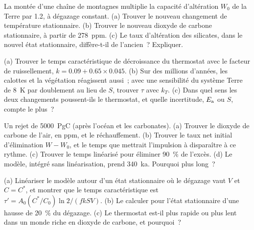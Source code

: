 \begin{exercise}[$\star\star$]\label{exo:b2:deep-time-climate:9}
La montée d'une chaîne de montagnes multiplie la capacité d'altération $W_0$ de la Terre par 1.2, à dégazage
constant. (a) Trouver le nouveau changement de température stationnaire. (b) Trouver le nouveau dioxyde de carbone
stationnaire, à partir de \qty{278}{ppm}. (c) Le taux d'altération des silicates, dans le nouvel état stationnaire,
diffère-t-il de l'ancien~? Expliquer.
\end{exercise}

\begin{exercise}[$\star\star\star$]\label{exo:b2:deep-time-climate:10}
(a) Trouver le temps caractéristique de décroissance du thermostat avec le facteur de ruissellement,
$k = 0.09 + 0.65\times0.045$. (b) Sur des millions d'années, les calottes et la végétation réagissent aussi~; avec une
sensibilité du système Terre de \qty{8}{K} par doublement au lieu de $S$, trouver $\tau$ avec $k_T$. (c) Dans quel sens
les deux changements poussent-ils le thermostat, et quelle incertitude, $E_{\text a}$ ou $S$, compte le plus~?
\end{exercise}

\begin{exercise}[$\star\star\star$]\label{exo:b2:deep-time-climate:11}
Un rejet de \qty{5000}{PgC} (après l'océan et les carbonates). (a) Trouver le dioxyde de carbone de
l'air, en ppm, et le réchauffement. (b) Trouver le taux net initial d'élimination $W - W_0$, et le temps que
mettrait l'impulsion à disparaître à ce rythme. (c) Trouver le temps linéarisé pour éliminer \qty{90}{\percent}
de l'excès. (d) Le modèle, intégré sans linéarisation, prend \qty{340}{ka}. Pourquoi plus long~?
\end{exercise}

\begin{exercise}[$\star\star\star$]\label{exo:b2:deep-time-climate:12}
(a) Linéariser le modèle autour d'un état stationnaire où le dégazage vaut $V$ et $C = C^*$, et montrer que le
temps caractéristique est $\tau' = A_0 (C^*/C_0)\ln 2/(f k S V)$. (b) Le calculer pour l'état stationnaire d'une
hausse de \qty{20}{\percent} du dégazage. (c) Le thermostat est-il plus rapide ou plus lent dans un monde riche en
dioxyde de carbone, et pourquoi~?
\end{exercise}

